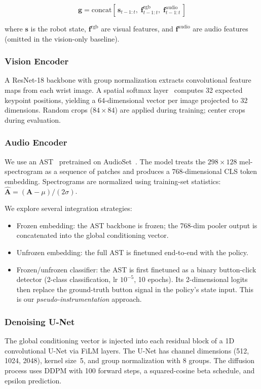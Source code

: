 \documentclass[conference]{IEEEtran}
\begin{document}
\begin{equation}
    \mathbf{g} = \text{concat}\!\left[\,\mathbf{s}_{t-1:t},\; \mathbf{f}^{\text{rgb}}_{t-1:t},\; \mathbf{f}^{\text{audio}}_{t-1:t}\,\right]
    \label{eq:global_cond}
\end{equation}

\noindent where $\mathbf{s}$ is the robot state, $\mathbf{f}^{\text{rgb}}$ are visual features, and $\mathbf{f}^{\text{audio}}$ are audio features (omitted in the vision-only baseline).

\subsubsection{Vision Encoder}
A ResNet-18 backbone with group normalization extracts convolutional feature maps from each wrist image.
A spatial softmax layer~\cite{finn2016spatial} computes 32 expected keypoint positions, yielding a 64-dimensional vector per image projected to 32 dimensions.
Random crops ($84{\times}84$) are applied during training; center crops during evaluation.

\subsubsection{Audio Encoder}
\label{sec:audio_encoder}
We use an AST~\cite{gong2021ast} pretrained on AudioSet~\cite{gemmeke2017audioset}.
The model treats the $298 \times 128$ mel-spectrogram as a sequence of patches and produces a 768-dimensional CLS token embedding.
Spectrograms are normalized using training-set statistics: $\hat{\mathbf{A}} = (\mathbf{A} - \mu) / (2\sigma)$.

We explore several integration strategies:
\begin{itemize}
    \item Frozen embedding: the AST backbone is frozen; the 768-dim pooler output is concatenated into the global conditioning vector.
    \item Unfrozen embedding: the full AST is finetuned end-to-end with the policy.
    \item Frozen/unfrozen classifier: the AST is first finetuned as a binary button-click detector (2-class classification, lr $10^{-5}$, 10 epochs). Its 2-dimensional logits then replace the ground-truth button signal in the policy's state input. This is our \emph{pseudo-instrumentation} approach.
\end{itemize}

\subsubsection{Denoising U-Net}
The global conditioning vector is injected into each residual block of a 1D convolutional U-Net via FiLM layers.
The U-Net has channel dimensions (512, 1024, 2048), kernel size~5, and group normalization with 8 groups.
The diffusion process uses DDPM with 100 forward steps, a squared-cosine beta schedule, and epsilon prediction.
\end{document}
